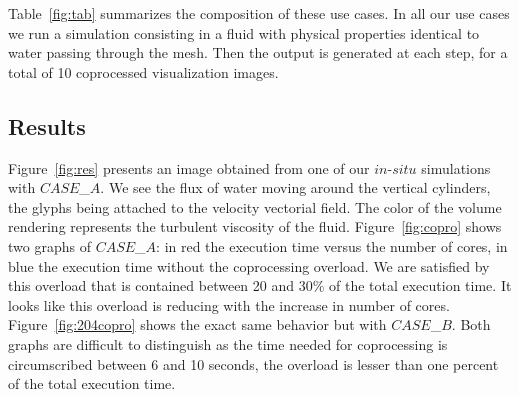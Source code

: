 Table~\ref{fig:tab} summarizes the composition of these use cases. In all our use cases we
run a simulation consisting in a fluid with physical properties identical to
water passing through the mesh. Then the output is generated at each step, for a
total of 10 coprocessed visualization images.

\subsection{Results}

Figure~\ref{fig:res} presents an image obtained from one of our $in$-$situ$
simulations with $CASE$\_$A$.
We see the flux of water moving around the vertical cylinders, the glyphs being attached 
to the velocity vectorial field. The color of the volume rendering represents 
the turbulent viscosity of the fluid. Figure~\ref{fig:copro} shows two graphs of
$CASE$\_$A$: in red the execution 
time versus the number of cores, in blue the execution time without
the coprocessing overload. We are satisfied by this overload that is contained
between 20 and 30\% of the total execution time. 
It looks like this overload is reducing with the increase in number of cores. 
Figure~\ref{fig:204copro} shows the exact same behavior but with $CASE$\_$B$. Both
graphs are difficult to distinguish as the time needed for coprocessing is
circumscribed between 6 and 10 seconds, the overload is lesser than one
percent of the total execution time.


